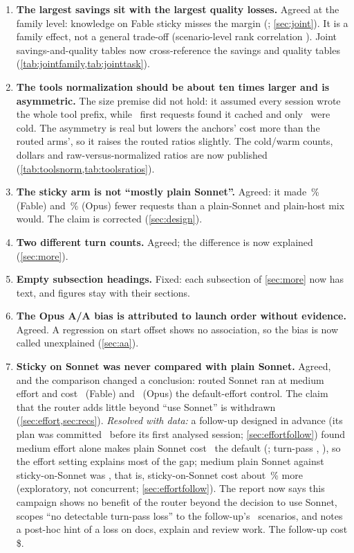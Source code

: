 \begin{enumerate}[leftmargin=1.6em]
    thin, though not a bootstrap artefact (\cref{sec:confirm}). Table and figure headers now label both readings
    co-primary.
  \item \textbf{The largest savings sit with the largest quality losses.} Agreed at the family level: knowledge on
    Fable sticky misses the margin (\RvKnowFableSticky; \cref{sec:joint}). It is a family effect, not a general
    trade-off (scenario-level rank correlation \RvSpearman). Joint savings-and-quality tables now cross-reference the
    savings and quality tables (\cref{tab:jointfamily,tab:jointtask}).
  \item \textbf{The tools normalization should be about ten times larger and is asymmetric.} The size premise did not
    hold: it assumed every session wrote the whole tool prefix, while \RvWarmTotal\ first requests found it cached and
    only \RvColdTotal\ were cold. The asymmetry is real but lowers the anchors' cost more than the routed arms', so it
    raises the routed ratios slightly. The cold/warm counts, dollars and raw-versus-normalized ratios are now
    published (\cref{tab:toolsnorm,tab:toolsratios}).
  \item \textbf{The sticky arm is not ``mostly plain Sonnet''.} Agreed: it made \RvReqGapFable\,\% (Fable) and
    \RvReqGapOpus\,\% (Opus) fewer requests than a plain-Sonnet and plain-host mix would. The claim is corrected
    (\cref{sec:design}).
  \item \textbf{Two different turn counts.} Agreed; the difference is now explained (\cref{sec:more}).
  \item \textbf{Empty subsection headings.} Fixed: each subsection of \cref{sec:more} now has text, and figures stay
    with their sections.
  \item \textbf{The Opus A/A bias is attributed to launch order without evidence.} Agreed. A regression on start offset
    shows no association, so the bias is now called unexplained (\cref{sec:aa}).
  \item \textbf{Sticky on Sonnet was never compared with plain Sonnet.} Agreed, and the comparison changed a
    conclusion: routed Sonnet ran at medium effort and cost \RvEffFableAll\X\ (Fable) and \RvEffOpusAll\X\ (Opus) the
    default-effort control. The claim that the router adds little beyond ``use Sonnet'' is withdrawn
    (\cref{sec:effort,sec:recs}). \emph{Resolved with data:} a follow-up designed in advance (its plan was committed \EcFirstAfter\ before its
    first analysed session; \cref{sec:effortfollow}) found medium effort alone makes
    plain Sonnet cost \EcRatio\X\ the default (\EcCI; turn-pass \EcQual, \EcQualCI), so the effort setting explains
    most of the gap; medium plain Sonnet against sticky-on-Sonnet was \EcSecRatio, that is, sticky-on-Sonnet cost
    about \EcSecGapPct\,\% more (exploratory, not concurrent; \cref{sec:effortfollow}). The report now says this
    campaign shows no benefit of the router beyond the decision to use Sonnet, scopes ``no detectable turn-pass
    loss'' to the follow-up's \EcScen\ scenarios, and notes a post-hoc hint of a loss on docs, explain and review work.
    The follow-up cost \$\EcSpend.
\end{enumerate}

